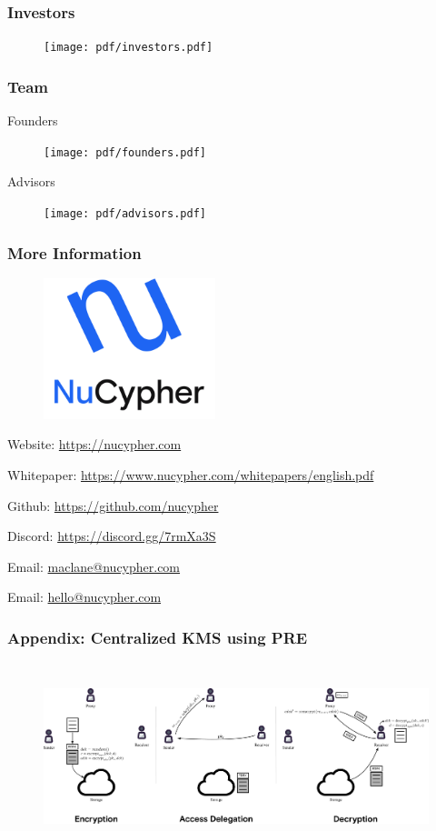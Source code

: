 \documentclass[xetex,mathsans,sans,aspectratio=169]{beamer}
\begin{document}
    \begin{frame}
      \frametitle{Investors}
        \begin{figure}
            \centering
            \texttt{[image: pdf/investors.pdf]}
        \end{figure}
    \end{frame}

    \begin{frame}
      \frametitle{Team}
        Founders
        \begin{figure}
            \centering
            \texttt{[image: pdf/founders.pdf]}
        \end{figure}

        Advisors
        \begin{figure}
            \centering
            \texttt{[image: pdf/advisors.pdf]}
        \end{figure}
    \end{frame}

    \begin{frame}
        \frametitle{More Information}
        \begin{figure}
            \centering
            \includegraphics[width=5cm]{pdf/nucypher_logo.pdf}
        \end{figure}
        Website: \url{https://nucypher.com}

        Whitepaper: \url{https://www.nucypher.com/whitepapers/english.pdf}

        Github: \url{https://github.com/nucypher}

        Discord: \url{https://discord.gg/7rmXa3S}

        Email: \href{mailto:maclane@nucypher.com}{maclane@nucypher.com}

        Email: \href{mailto:hello@nucypher.com}{hello@nucypher.com}
    \end{frame}

     \begin{frame}
        \frametitle{Appendix: Centralized KMS using PRE}
        \begin{figure}
            \centering
            \includegraphics[height=5.4cm]{pdf/centralized-consolidated.pdf}
        \end{figure}
    \end{frame}
\end{document}
